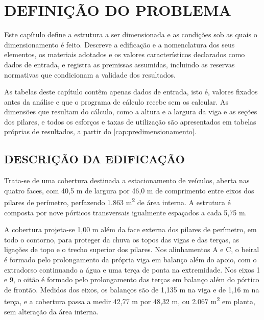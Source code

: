 
\chapter{DEFINIÇÃO DO PROBLEMA}\label{cap:definicao-problema}

Este capítulo define a estrutura a ser dimensionada e as condições sob as quais
o dimensionamento é feito. Descreve a edificação e a nomenclatura dos seus
elementos, os materiais adotados e os valores característicos declarados como
dados de entrada, e registra as premissas assumidas, incluindo as reservas
normativas que condicionam a validade dos resultados.

As tabelas deste capítulo contêm apenas dados de entrada, isto é, valores
fixados antes da análise e que o programa de cálculo recebe sem os calcular. As
dimensões que resultam do cálculo, como a altura e a largura da viga e as seções
dos pilares, e todos os esforços e taxas de utilização são apresentados em
tabelas próprias de resultados, a partir do \autoref{cap:predimensionamento}.

\section{DESCRIÇÃO DA EDIFICAÇÃO}\label{sec:descricao-edificacao}

Trata-se de uma cobertura destinada a estacionamento de veículos, aberta nas
quatro faces, com 40,5 m de largura por 46,0 m de comprimento entre eixos dos
pilares de perímetro, perfazendo 1.863 m\textsuperscript{2} de área interna. A
estrutura é composta por nove pórticos transversais igualmente espaçados a cada
5,75 m.

A cobertura projeta-se 1,00 m além da face externa dos pilares de perímetro,
em todo o contorno, para proteger da chuva os topos das vigas e das terças, as
ligações de topo e o trecho superior dos pilares. Nos alinhamentos A e C, o
beiral é formado pelo prolongamento da própria viga em balanço além do apoio,
com o extradorso continuando a água e uma terça de ponta na extremidade. Nos
eixos 1 e 9, o oitão é formado pelo prolongamento das terças em balanço além do
pórtico de frontão. Medidos dos eixos, os balanços são de 1,135 m na viga e de
1,16 m na terça, e a cobertura passa a medir 42,77 m por 48,32 m, ou
2.067 m\textsuperscript{2} em planta, sem alteração da área interna.

